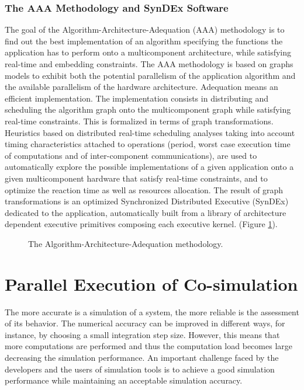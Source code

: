 \subsubsection{The AAA Methodology and SynDEx Software}

The goal of the Algorithm-Architecture-Adequation (AAA) methodology \cite{sorel:1996} is to find out the best implementation of an algorithm specifying the functions the application has to perform onto a multicomponent architecture, while satisfying real-time and embedding constraints. The AAA methodology is based on graphs models to exhibit both the potential parallelism of the application algorithm and the available parallelism of the hardware architecture.  Adequation means an efficient implementation. The implementation consists in distributing and scheduling the algorithm graph onto the multicomponent graph while satisfying real-time constraints. This is formalized in terms of graph transformations. Heuristics based on distributed real-time scheduling analyses taking into account timing characteristics attached to operations (period, worst case execution time of computations and of inter-component communications), are used to automatically explore the possible implementations of a given application onto a given multicomponent hardware that satisfy real-time constraints, and to optimize the reaction time as well as resources allocation. The result of graph transformations is an optimized Synchronized Distributed Executive (SynDEx) dedicated to the application, automatically built from a library of architecture dependent executive primitives composing each executive kernel. (Figure \ref{fig:aaa}).

\begin{figure}[phbt]
\centering

\caption{The Algorithm-Architecture-Adequation methodology.}
\label{fig:aaa}
\end{figure} 

\section{Parallel Execution of Co-simulation}

The more accurate is a simulation of a system, the more reliable is the assessment of its behavior. The numerical accuracy can be improved in different ways, for instance, by choosing a small integration step size. However, this means that more computations are performed and thus the computation load becomes large decreasing the simulation performance. An important challenge faced by the developers and the users of simulation tools is to achieve a good simulation performance while maintaining an acceptable simulation accuracy. 

